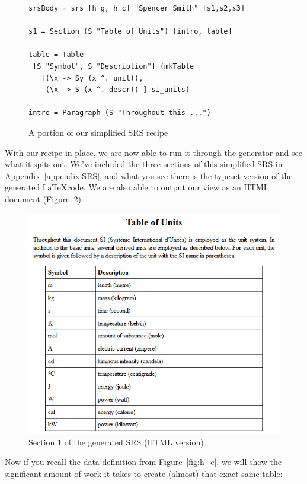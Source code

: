 \documentclass[preprint, 10pt]{sigplanconf}
\begin{document}
\begin{figure}[tb]
\begin{lstlisting}[frame=single, 
  showstringspaces=false, basicstyle=\scriptsize]
srsBody = srs [h_g, h_c] "Spencer Smith" [s1,s2,s3]

s1 = Section (S "Table of Units") [intro, table]

table = Table 
 [S "Symbol", S "Description"] (mkTable
   [(\x -> Sy (x ^. unit)),
    (\x -> S (x ^. descr)) ] si_units)

intro = Paragraph (S "Throughout this ...")
\end{lstlisting}
\caption{A portion of our simplified SRS recipe}
\label{fig:recipe}
\end{figure}

With our recipe in place, we are now able to run it through the generator and
see what it spits out. We've included the three sections of this simplified SRS
in Appendix~\ref{appendix:SRS}, and what you see there is the typeset version of
the generated \LaTeX code. We are also able to output our view as an HTML
document (Figure~\ref{fig:HTML_s1}).

\begin{figure}
\includegraphics[scale=0.5]{HTML_s1.png}
\caption{Section 1 of the generated SRS (HTML version)}
\label{fig:HTML_s1}
\end{figure}

Now if you recall the data definition from Figure~\ref{fig:h_c}, we will show
the significant amount of work it takes to create (almost) that exact same
table: %
\end{document}

